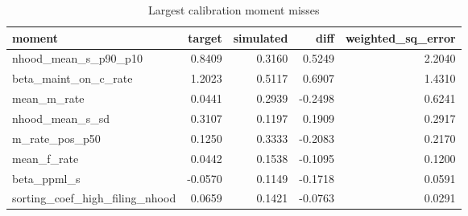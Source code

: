 \begin{table}

\caption{Largest calibration moment misses}
\centering
\begin{tabular}[t]{lrrrr}
\toprule
moment & target & simulated & diff & weighted\_sq\_error\\
\midrule
nhood\_mean\_s\_p90\_p10 & 0.8409 & 0.3160 & 0.5249 & 2.2040\\
beta\_maint\_on\_c\_rate & 1.2023 & 0.5117 & 0.6907 & 1.4310\\
mean\_m\_rate & 0.0441 & 0.2939 & -0.2498 & 0.6241\\
nhood\_mean\_s\_sd & 0.3107 & 0.1197 & 0.1909 & 0.2917\\
m\_rate\_pos\_p50 & 0.1250 & 0.3333 & -0.2083 & 0.2170\\
mean\_f\_rate & 0.0442 & 0.1538 & -0.1095 & 0.1200\\
beta\_ppml\_s & -0.0570 & 0.1149 & -0.1718 & 0.0591\\
sorting\_coef\_high\_filing\_nhood & 0.0659 & 0.1421 & -0.0763 & 0.0291\\
\bottomrule
\end{tabular}
\end{table}
